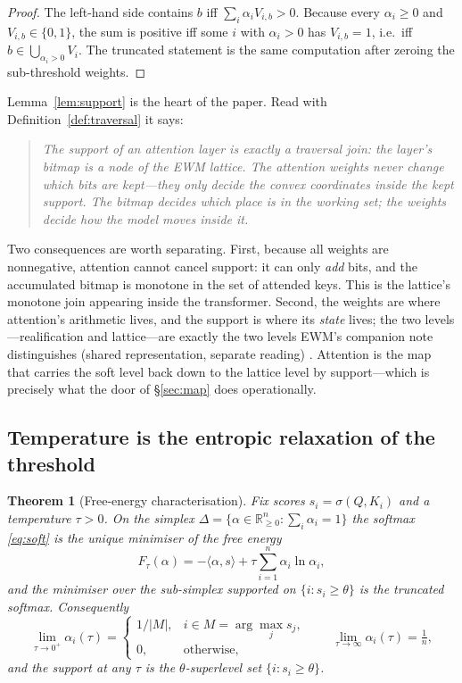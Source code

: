 \documentclass[11pt,a4paper]{article}
\newtheorem{theorem}[principle]{Theorem}
\theoremstyle{remark}
\newcommand{\sigm}{\ensuremath{\sigma}}                 %
\begin{document}
\begin{proof}
The left-hand side contains $b$ iff $\sum_i\alpha_i V_{i,b}>0$. Because every
$\alpha_i\ge0$ and $V_{i,b}\in\{0,1\}$, the sum is positive iff some $i$ with
$\alpha_i>0$ has $V_{i,b}=1$, i.e.\ iff $b\in\bigcup_{\alpha_i>0}V_i$. The
truncated statement is the same computation after zeroing the sub-threshold
weights.
\end{proof}

Lemma~\ref{lem:support} is the heart of the paper. Read with
Definition~\ref{def:traversal} it says:

\begin{quote}
\emph{The support of an attention layer is exactly a traversal join: the layer's
bitmap is a node of the EWM lattice. The attention weights never change which
bits are kept---they only decide the convex coordinates inside the kept
support. The bitmap decides which place is in the working set; the weights
decide how the model moves inside it.}
\end{quote}

Two consequences are worth separating. First, because all weights are
nonnegative, attention cannot cancel support: it can only \emph{add} bits, and
the accumulated bitmap is monotone in the set of attended keys. This is the
lattice's monotone join appearing inside the transformer. Second, the weights
are where attention's arithmetic lives, and the support is where its
\emph{state} lives; the two levels---realification and lattice---are exactly
the two levels EWM's companion note distinguishes (shared representation,
separate reading) \cite{companion2026}. Attention is the map that carries the
soft level back down to the lattice level by support---which is precisely what
the door of \S\ref{sec:map} does operationally.

\subsection{Temperature is the entropic relaxation of the threshold}

\begin{theorem}[Free-energy characterisation]
\label{thm:free}
Fix scores $s_i=\sigm(Q,K_i)$ and a temperature $\tau>0$. On the simplex
$\Delta=\{\alpha\in\mathbb{R}^n_{\ge0}:\sum_i\alpha_i=1\}$ the softmax
\eqref{eq:soft} is the unique minimiser of the free energy
\begin{equation}
\label{eq:free}
  F_\tau(\alpha)=-\langle\alpha,s\rangle+\tau\!\sum_{i=1}^{n}\alpha_i\ln\alpha_i ,
\end{equation}
and the minimiser over the sub-simplex supported on $\{i:s_i\ge\theta\}$ is the
truncated softmax. Consequently
\[
  \lim_{\tau\to0^+}\alpha_i(\tau)=
  \begin{cases}1/|M|,& i\in M=\arg\max_j s_j,\\ 0,&\text{otherwise,}\end{cases}
  \qquad
  \lim_{\tau\to\infty}\alpha_i(\tau)=\tfrac1n ,
\]
and the support at any $\tau$ is the $\theta$-superlevel set
$\{i:s_i\ge\theta\}$.
\end{theorem}
\end{document}
